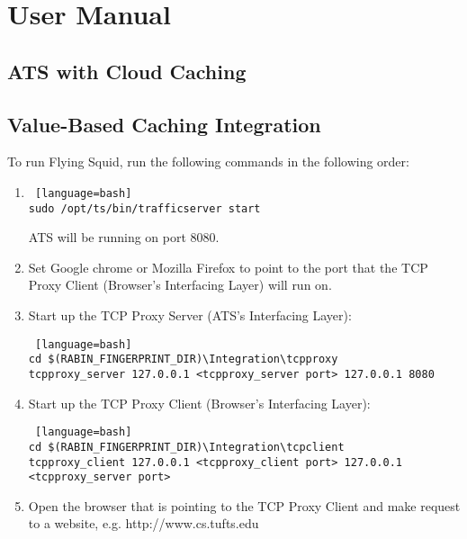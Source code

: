 \section{User Manual}

\subsection{ATS with Cloud Caching}



\subsection{Value-Based Caching Integration}

To run Flying Squid, run the following commands in the following order:

\begin{enumerate}

\item 

\begin{lstlisting} [language=bash] 
sudo /opt/ts/bin/trafficserver start
\end{lstlisting}

ATS will be running on port 8080.

\item 

Set Google chrome or Mozilla Firefox to point to the port that the TCP Proxy Client (Browser's Interfacing Layer) will run on. 

\item 

Start up the TCP Proxy Server (ATS's Interfacing Layer):

\begin{lstlisting} [language=bash] 
cd $(RABIN_FINGERPRINT_DIR)\Integration\tcpproxy
tcpproxy_server 127.0.0.1 <tcpproxy_server port> 127.0.0.1 8080
\end{lstlisting}

\item

Start up the TCP Proxy Client (Browser's Interfacing Layer):

\begin{lstlisting} [language=bash] 
cd $(RABIN_FINGERPRINT_DIR)\Integration\tcpclient
tcpproxy_client 127.0.0.1 <tcpproxy_client port> 127.0.0.1 <tcpproxy_server port>
\end{lstlisting}

\item

Open the browser that is pointing to the TCP Proxy Client and make request to a website, e.g. http://www.cs.tufts.edu




\end{enumerate}